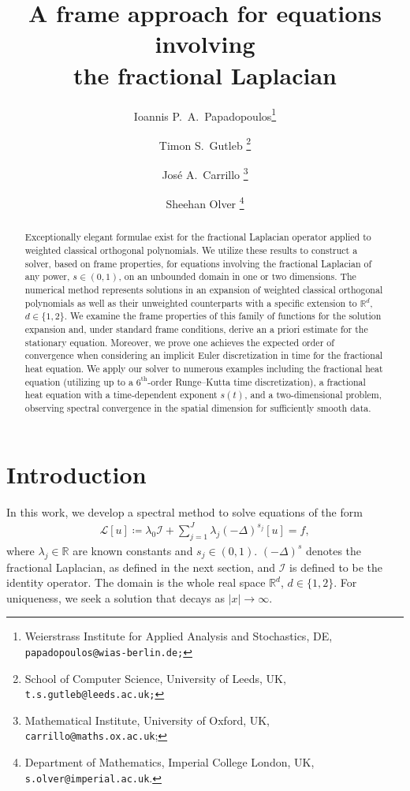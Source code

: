 \documentclass[10pt,a4paper]{article}
\title{A frame approach for equations  involving \\ the fractional Laplacian}
\author{
Ioannis P.~A.~Papadopoulos\thanks{Weierstrass Institute for Applied Analysis and Stochastics, DE,  \tt{papadopoulos@wias-berlin.de};} \and 
Timon S.~Gutleb \thanks{School of Computer Science, University of Leeds, UK, {\tt t.s.gutleb@leeds.ac.uk;}} \and
Jos\'e A.~Carrillo \thanks{Mathematical Institute, University of Oxford, UK, {\tt carrillo@maths.ox.ac.uk};} \and
Sheehan Olver \thanks{Department of Mathematics, Imperial College London, UK, {\tt{s.olver@imperial.ac.uk}}.}}
\numberwithin{equation}{section}
\begin{document}
\maketitle
\date
\thispagestyle{empty}
\pagestyle{fancy}
\lhead{}


\begin{abstract}
Exceptionally elegant formulae  exist for the fractional Laplacian operator applied to weighted classical orthogonal polynomials. We utilize these results to construct  a solver,  based on frame properties, for equations involving the fractional Laplacian of any power, $s \in  (0,1)$, on an unbounded domain in one or two dimensions. The numerical method  represents solutions in  an expansion of weighted classical orthogonal polynomials as well as their unweighted counterparts with a specific extension to $\mathbb{R}^d$, $d \in \{1,2\}$.    We examine the frame properties of this family of functions for the solution expansion and, under standard frame conditions, derive an a priori estimate for the stationary equation. Moreover, we prove  one achieves the expected order of convergence when considering an implicit Euler discretization in time for the fractional heat equation. We apply our solver to numerous examples including the fractional heat equation (utilizing up to a $6^\text{th}$-order Runge--Kutta time discretization), a fractional heat equation with a time-dependent exponent $s(t)$, and a two-dimensional problem, observing spectral convergence in the spatial dimension for sufficiently smooth data.
\end{abstract}

\section{Introduction}
\label{sec:introduction}

In this work, we develop a spectral method to solve equations of the form
\begin{align}
\mathcal{L}[u] \coloneqq  \lambda_0 \mathcal{I}  + \sum_{j =1}^{ J } \lambda_{ j } (-\Delta)^{s_{ j }}[u] = f,
\label{eq:fpde}
\end{align}
where $\lambda_{ j } \in \mathbb{R}$ are known constants and $s_{ j } \in  (0,1)$.  $(-\Delta)^{s}$ denotes the fractional Laplacian, as defined in the next section, and $\mathcal{I}$ is defined to be the identity operator. The domain is the whole real space $\mathbb{R}^d$, $d \in \{1,2\}$. For uniqueness, we seek a solution that decays as $|x| \to \infty$.  
\end{document}
